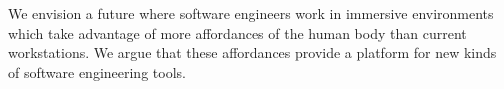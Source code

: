 \documentclass[conference]{IEEEtran}
\begin{document}
We envision a future where software engineers work in immersive environments which take advantage of more affordances of the human body than current workstations.
We argue that these affordances provide a platform for new kinds of software engineering tools. 








\end{document}
